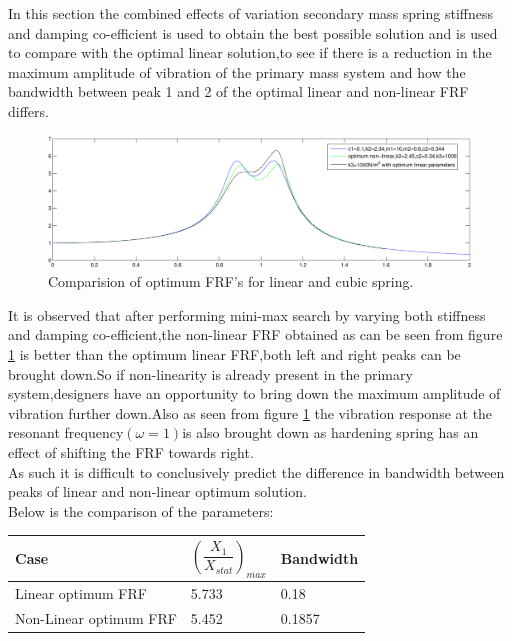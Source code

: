 In this section the combined effects of variation secondary mass spring stiffness and damping co-efficient is used to obtain the best possible solution and is used to compare with the optimal linear solution,to see if there is a reduction in the maximum amplitude of vibration of the primary mass system and how the bandwidth between peak 1 and 2 of the optimal linear and non-linear FRF differs.
\begin{figure}[h!]
\includegraphics[width=\textwidth,height=0.5\textwidth]{"figures/nonlinearity_primaryymass_1"}
\caption{Comparision of optimum FRF's for linear and cubic spring.}
  \label{fig:optimum FRF}
\end{figure}
It is observed that after performing mini-max search by varying both stiffness and damping co-efficient,the non-linear FRF obtained as can be seen from figure \ref{fig:optimum FRF} is better than the optimum linear FRF,both left and right peaks can be brought down.So if non-linearity is already present in the primary system,designers have an opportunity to bring down the maximum amplitude of vibration further down.Also as seen from figure \ref{fig:optimum FRF} the vibration response at the resonant frequency$(\omega=1)$is also brought down as hardening spring has an effect of shifting the FRF towards right.\\
As such it is difficult to conclusively predict the difference in bandwidth between peaks of linear and non-linear optimum solution.\\
Below is the comparison of the parameters:
\begin{table}[h!]
\centering
\begin{tabular}{|m{6cm}|m{2cm}|m{2cm}|} 
\hline
Case& $\left(\dfrac{X_{1}}{X_{stat}}\right)_{max}$ & Bandwidth \\
\hline
Linear optimum FRF & 5.733 & 0.18 

\\
\hline
Non-Linear optimum FRF & 5.452 & 0.1857

 \\ 
\hline
\end{tabular}
\end{table}
